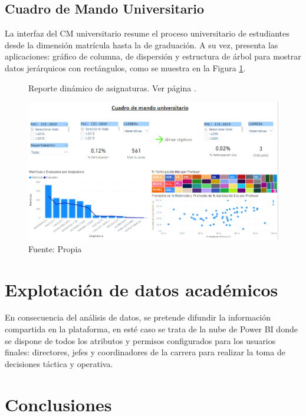 \documentclass[12pt,jou]{apa7}
\begin{document}
\subsection{Cuadro de Mando Universitario}
La interfaz del CM universitario resume el proceso universitario de estudiantes desde la dimensión matrícula hasta la de graduación. A su vez, presenta las aplicaciones: gráfico de columna, de dispersión y estructura de árbol para mostrar datos jerárquicos con rectángulos, como se muestra en la Figura \ref{fig: cuadroMando}.

\begin{figure}[h]
\caption{Reporte dinámico de asignaturas. Ver página \pageref{cuadroMando}.}
\centering
\includegraphics[width=0.9\linewidth]{Figuras/cuadroMando}
\caption*{ Fuente: Propia}
\label{fig: cuadroMando}
\end{figure}



\section{Explotación de datos académicos}
En consecuencia del análisis de datos, se pretende difundir la información compartida en la plataforma, en esté caso se trata de la nube de Power BI donde se dispone de todos los atributos y permisos configurados para los usuarios finales: directores, jefes y coordinadores de la carrera para realizar la toma de decisiones táctica y operativa.


\section{Conclusiones}
\end{document}
